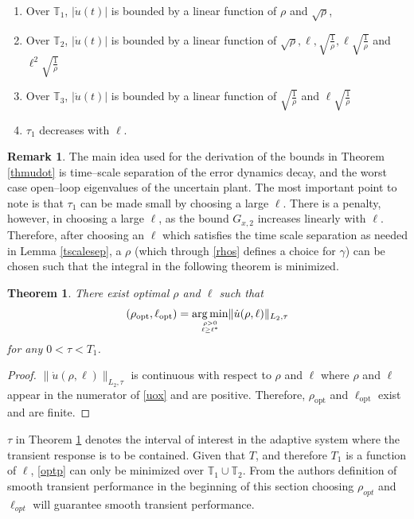 \documentclass[10pt,journal]{IEEEtran}
\theoremstyle{plain}%
\newtheorem{thm}{Theorem}%
\theoremstyle{definition}
\newtheorem{rem}{Remark}
\newcommand{\be}[0]{\begin{equation}}
\newcommand{\ee}[0]{\end{equation}}
\newcommand{\norms}[1]{\lVert#1\rVert}
\newcommand{\normB}[0]{\norms}
\let\norm=\normB
\newcommand{\abs}[1]{\left\lvert#1\right\rvert}
\DeclareMathOperator*{\argmin}{arg\,min}
\begin{document}
\begin{enumerate}[(\bf {A}1)]
\item Over $\mathbb T_1$, $\abs{\dot u(t)}$ is bounded by a linear function of $\rho$ and $\sqrt{\rho}$, 
\item Over $\mathbb T_2$, $\abs{\dot u(t)}$ is bounded by a linear function of $\sqrt \rho,\ell,\sqrt {\frac{1}{\rho}},\ell \sqrt {\frac{1}{\rho}}$ and $\ell^2\sqrt {\frac{1}{\rho}} $
\item Over $\mathbb T_3$, $\abs{\dot u(t)}$ is bounded by a linear function of $\sqrt {\frac{1}{\rho}}$ and $\ell \sqrt {\frac{1}{\rho}}$
\item $\tau_1$ decreases with $\ell$.
\end{enumerate}


\begin{rem} The main idea used for the derivation of the bounds in Theorem \ref{thmudot} is time--scale separation of the error dynamics decay, and the worst case open--loop eigenvalues of the uncertain plant. The most important point to note is that $\tau_1$ can be made small by choosing a large $\ell$. There is a penalty, however, in choosing a large $\ell$, as the bound $G_{x,2}$ increases linearly with $\ell$. Therefore, after choosing an $\ell$ which satisfies the time scale separation as needed in Lemma \ref{tscalesep}, a $\rho$ (which through \eqref{rhos} defines a choice for $\gamma$) can be chosen such that the integral in the following theorem is minimized. \end{rem}

\begin{thm}\label{thmpopt}
There exist optimal $\rho$ and $\ell$ such that
\be\label{optp}
\left(\rho_\text{opt},\ell_\text{opt}\right)=\argmin_{{\rho>0} \atop{\ell\geq\ell^*}} \norm{\dot u(\rho,\ell)}_{L_2, \tau}
\ee
for any $0 < \tau < T_1$.
\end{thm}
\begin{proof}
$\norm{\dot u(\rho,\ell)}_{L_2, \tau}$ is continuous with respect to $\rho$ and $\ell$ where $\rho$ and $\ell$ appear in the numerator of  \eqref{uox} and are positive. Therefore, $\rho_\text{opt}$ and $\ell_\text{opt}$ exist and are finite.
\end{proof}

$\tau$ in Theorem \ref{thmpopt} denotes the interval of interest in the adaptive system where the transient response is to be contained. Given that $T$, and therefore $T_1$ is a function of $\ell$, \eqref{optp} can only be minimized over $\mathbb T_1 \cup \mathbb T_2$. From the authors definition of smooth transient performance in the beginning of this section choosing $\rho_{opt}$ and $\ell_{opt}$ will guarantee smooth transient performance. 
\end{document}
